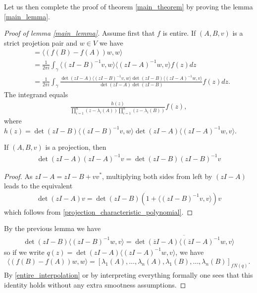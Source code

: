 Let us then complete the proof of theorem \ref{main_theorem} by proving the lemma \ref{main_lemma}.

\begin{proof}[Proof of lemma \ref{main_lemma}]
	Assume first that $f$ is entire. If $(A, B, v)$ is a strict projetion pair and $w \in V$ we have
	\begin{align*}
		&= \langle (f(B) - f(A)) w, w \rangle \\
		&= \frac{1}{2 \pi i}\int_{\gamma} \langle (z I - B)^{-1} v, w \rangle  \langle (z I - A)^{-1} w, v \rangle f(z) dz \\
		&= \frac{1}{2 \pi i}\int_{\gamma} \frac{\det(z I - A)\langle (z I - B)^{-1} v, w \rangle \det(z I - B) \langle (z I - A)^{-1} w, v \rangle}{\det(z I - A) \det(z I - B)} f(z) dz.
	\end{align*}
	The integrand equals
	\begin{align*}
		\frac{h(z)}{\prod_{i = 1}^{n}(z - \lambda_{i}(A)) \prod_{i = 1}^{n}(z - \lambda_{i}(B))} f(z),
	\end{align*}
	where $h(z) = \det(z I - B)\langle (z I - B)^{-1} v, w \rangle \det(z I - A) \langle (z I - A)^{-1} w, v \rangle$.
	\begin{lem}
		If $(A, B, v)$ is a projection, then
		\begin{align*}
			\det(z I - A) (z I - A)^{-1} v = \det(z I - B) (z I - B)^{-1} v
		\end{align*} 
	\end{lem}
	\begin{proof}
		As $z I - A = z I - B + v v^{*}$, multiplying both sides from left by $(z I - A)$ leads to the equivalent
		\begin{align*}
			\det(z I - A) v = \det(z I - B) (1 + \langle (z I - B)^{-1} v, v \rangle) v
		\end{align*}
		which follows from \ref{projection_characteristic_polynomial}.
	\end{proof}
	By the previous lemma we have
	\begin{align*}
		\det(z I - B) \langle (z I - B)^{-1} w, v \rangle = \overline{\det(\overline{z} I - A) \langle (\overline{z} I - A)^{-1} w, v \rangle}
	\end{align*}
	so
	if we write $q(z) = \det(z I - A) \langle (z I - A)^{-1} w, v \rangle$, we have
	\begin{align*}
		\langle (f(B) - f(A)) w, w \rangle = [\lambda_{1}(A), \ldots, \lambda_{n}(A), \lambda_{1}(B), \ldots, \lambda_{n}(B)]_{f N(q)}.
	\end{align*}
	By \ref{entire_interpolation} or by interpreting everything formally one sees that this identity holds without any extra smootness assumptions.


\end{proof}
